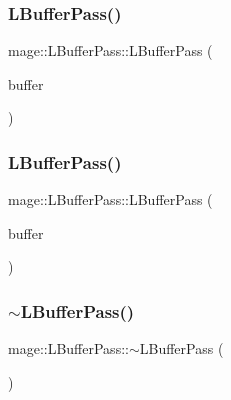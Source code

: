 \hypertarget{structmage_1_1_l_buffer_pass_a0cd35fd1ded3c17d04c1689d1e30e476}{}\label{structmage_1_1_l_buffer_pass_a0cd35fd1ded3c17d04c1689d1e30e476} 
\subsubsection{\texorpdfstring{L\+Buffer\+Pass()}{LBufferPass()}\hspace{0.1cm}{\footnotesize\ttfamily [2/3]}}
{\footnotesize\ttfamily mage\+::\+L\+Buffer\+Pass\+::\+L\+Buffer\+Pass (\begin{DoxyParamCaption}\item[{const \hyperlink{structmage_1_1_l_buffer_pass}{L\+Buffer\+Pass} \&}]{buffer }\end{DoxyParamCaption})\hspace{0.3cm}{\ttfamily [delete]}}

\hypertarget{structmage_1_1_l_buffer_pass_ae87591e020b5c87ba219aad132669276}{}\label{structmage_1_1_l_buffer_pass_ae87591e020b5c87ba219aad132669276} 
\subsubsection{\texorpdfstring{L\+Buffer\+Pass()}{LBufferPass()}\hspace{0.1cm}{\footnotesize\ttfamily [3/3]}}
{\footnotesize\ttfamily mage\+::\+L\+Buffer\+Pass\+::\+L\+Buffer\+Pass (\begin{DoxyParamCaption}\item[{\hyperlink{structmage_1_1_l_buffer_pass}{L\+Buffer\+Pass} \&\&}]{buffer }\end{DoxyParamCaption})\hspace{0.3cm}{\ttfamily [default]}}

\hypertarget{structmage_1_1_l_buffer_pass_abb6727e9cacfb21ac140aeac68f18171}{}\label{structmage_1_1_l_buffer_pass_abb6727e9cacfb21ac140aeac68f18171} 
\subsubsection{\texorpdfstring{$\sim$\+L\+Buffer\+Pass()}{~LBufferPass()}}
{\footnotesize\ttfamily mage\+::\+L\+Buffer\+Pass\+::$\sim$\+L\+Buffer\+Pass (\begin{DoxyParamCaption}{ }\end{DoxyParamCaption})\hspace{0.3cm}{\ttfamily [default]}}




